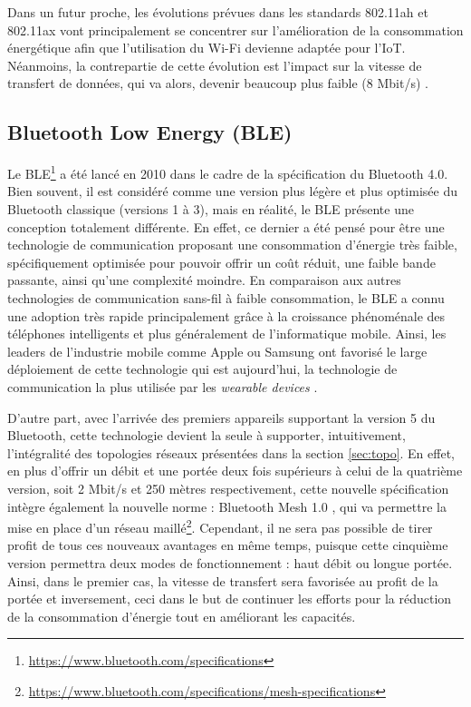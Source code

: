 Dans un futur proche, les évolutions prévues dans les standards 802.11ah et 802.11ax vont principalement se concentrer sur l'amélioration de la consommation énergétique afin que l'utilisation du Wi-Fi devienne adaptée pour l'\acs{IoT}. Néanmoins, la contrepartie de cette évolution est l'impact sur la vitesse de transfert de données, qui va alors, devenir beaucoup plus faible (8 Mbit/s) \citep{Sun2013}.

\subsection{Bluetooth Low Energy (\acs{BLE})}
\label{subec:com_ble}

Le \acs{BLE}\footnote{\url{https://www.bluetooth.com/specifications}} a été lancé en 2010 dans le cadre de la spécification du Bluetooth 4.0. Bien souvent, il est considéré comme une version plus légère et plus optimisée du Bluetooth classique (versions 1 à 3), mais en réalité, le \acs{BLE} présente une conception totalement différente. En effet, ce dernier a été pensé pour être une technologie de communication proposant une consommation d'énergie très faible, spécifiquement optimisée pour pouvoir offrir un coût réduit, une faible bande passante, ainsi qu'une complexité moindre. En comparaison aux autres technologies de communication sans-fil à faible consommation, le \acs{BLE} a connu une adoption très rapide principalement grâce à la croissance phénoménale des téléphones intelligents et plus généralement de l'informatique mobile. Ainsi, les leaders de l’industrie mobile comme Apple ou Samsung ont favorisé le large déploiement de cette technologie qui est aujourd'hui, la technologie de communication la plus utilisée par les \textit{wearable devices} \citep{Gomez2012b}.

D'autre part, avec l'arrivée des premiers appareils supportant la version 5 du Bluetooth, cette technologie devient la seule à supporter, intuitivement, l'intégralité des topologies réseaux présentées dans la section \ref{sec:topo}. En effet, en plus d'offrir un débit et une portée deux fois supérieurs à celui de la quatrième version, soit 2 Mbit/s et 250 mètres respectivement, cette nouvelle spécification intègre également la nouvelle norme : \og Bluetooth Mesh 1.0 \fg, qui va permettre la mise en place d'un réseau maillé\footnote{\url{https://www.bluetooth.com/specifications/mesh-specifications}}. Cependant, il ne sera pas possible de tirer profit de tous ces nouveaux avantages en même temps, puisque cette cinquième version permettra deux modes de fonctionnement : haut débit ou longue portée. Ainsi, dans le premier cas, la vitesse de transfert sera favorisée au profit de la portée et inversement, ceci dans le but de continuer les efforts pour la réduction de la consommation d'énergie tout en améliorant les capacités.

